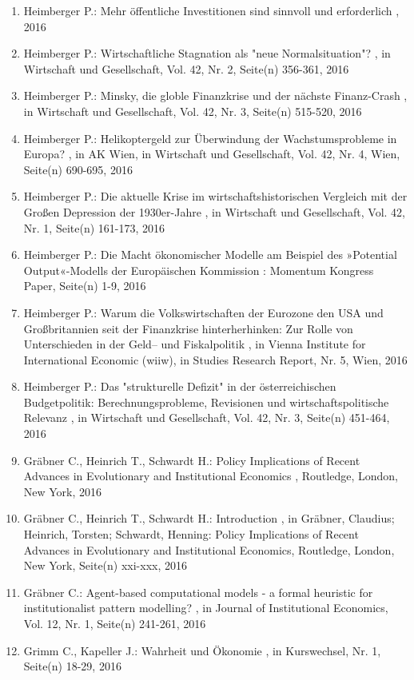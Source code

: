 \begin{enumerate}[leftmargin=*, labelsep=0.5cm]
	 \item Heimberger P.:  Mehr öffentliche Investitionen sind sinnvoll und erforderlich  , 2016
	 \item Heimberger P.:  Wirtschaftliche Stagnation als "neue Normalsituation"?  , in Wirtschaft und Gesellschaft, Vol. 42, Nr. 2, Seite(n) 356-361, 2016
	 \item Heimberger P.:  Minsky, die globle Finanzkrise und der nächste Finanz-Crash  , in Wirtschaft und Gesellschaft, Vol. 42, Nr. 3, Seite(n) 515-520, 2016
	 \item Heimberger P.:  Helikoptergeld zur Überwindung der Wachstumsprobleme in Europa?  , in AK Wien, in Wirtschaft und Gesellschaft, Vol. 42, Nr. 4, Wien, Seite(n) 690-695, 2016
	 \item Heimberger P.:  Die aktuelle Krise im wirtschaftshistorischen Vergleich mit der Großen Depression der 1930er-Jahre  , in Wirtschaft und Gesellschaft, Vol. 42, Nr. 1, Seite(n) 161-173, 2016
	 \item Heimberger P.:  Die Macht ökonomischer Modelle am Beispiel des »Potential Output«-Modells der Europäischen Kommission  : Momentum Kongress Paper, Seite(n) 1-9, 2016
	 \item Heimberger P.:  Warum die Volkswirtschaften der Eurozone den USA und Großbritannien seit der Finanzkrise hinterherhinken: Zur Rolle von Unterschieden in der Geld– und Fiskalpolitik  , in Vienna Institute for International Economic (wiiw), in Studies Research Report, Nr. 5, Wien, 2016
	 \item Heimberger P.:  Das "strukturelle Defizit" in der österreichischen Budgetpolitik: Berechnungsprobleme, Revisionen und wirtschaftspolitische Relevanz  , in Wirtschaft und Gesellschaft, Vol. 42, Nr. 3, Seite(n) 451-464, 2016
	 \item Gräbner C., Heinrich T., Schwardt H.:  Policy Implications of Recent Advances in Evolutionary and Institutional Economics  , Routledge, London, New York, 2016
	 \item Gräbner C., Heinrich T., Schwardt H.:  Introduction  , in Gräbner, Claudius; Heinrich, Torsten; Schwardt, Henning: Policy Implications of Recent Advances in Evolutionary and Institutional Economics, Routledge, London, New York, Seite(n) xxi-xxx, 2016
	 \item Gräbner C.:  Agent-based computational models - a formal heuristic for institutionalist pattern modelling?  , in Journal of Institutional Economics, Vol. 12, Nr. 1, Seite(n) 241-261, 2016
	 \item Grimm C., Kapeller J.:  Wahrheit und Ökonomie  , in Kurswechsel, Nr. 1, Seite(n) 18-29, 2016

\end{enumerate}

